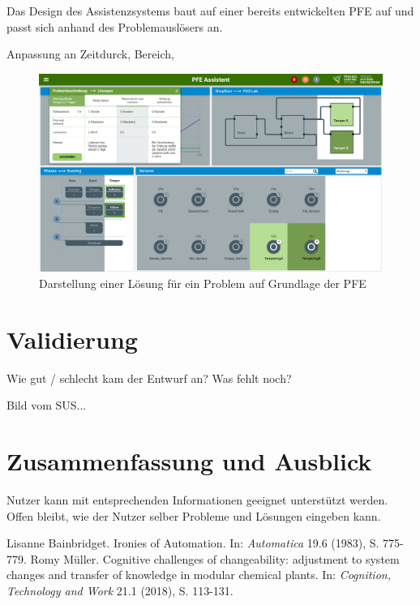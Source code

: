 \documentclass{ifaPoster}
\begin{document}
Das Design des Assistenzsystems baut auf einer bereits entwickelten PFE auf \cite{} und passt sich anhand des Problemauslösers an.

Anpassung an Zeitdurck, Bereich, 

\begin{figure}[htbp]
\centering
\includegraphics[scale=0.4]{DA_files/Prototyp-PFE-Loesung2.png}
\caption{Darstellung einer Lösung für ein Problem auf Grundlage der PFE}
\end{figure}

\section{Validierung}
Wie gut / schlecht kam der Entwurf an? Was fehlt noch?

Bild vom SUS...



\section{Zusammenfassung und Ausblick}
Nutzer kann mit entsprechenden Informationen geeignet unterstützt werden. Offen bleibt, wie der Nutzer selber Probleme und Lösungen eingeben kann.


 {\tiny\renewcommand{\section}[2]{}%
 	 \begin{thebibliography}{8.5}
 	 	Lisanne Bainbridget. {\glqq Ironies of Automation\grqq}. {In: \textit{Automatica}} 19.6 (1983), S. 775-779.
 	 Romy Müller. {\glqq Cognitive challenges of changeability: adjustment
to system changes and transfer of knowledge in modular
chemical plants\grqq}. {In: \textit{Cognition, Technology and Work}} 21.1 (2018), S. 113-131.
	\end{thebibliography}}
	
\end{document}
